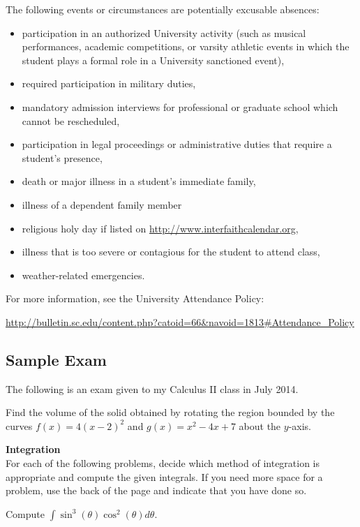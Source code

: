 \documentclass[teaching.portfolio.tex]{subfiles}
\begin{document}
\noindent
The following events or circumstances are potentially excusable absences:
\begin{itemize}
\item
  participation in an authorized University activity (such as musical performances, academic competitions, or varsity athletic events in which the student plays a formal role in a University sanctioned event),
\item
  required participation in military duties,
\item
  mandatory admission interviews for professional or graduate school which cannot be rescheduled,
\item
  participation in legal proceedings or administrative duties that require a student's presence,
\item
  death or major illness in a student’s immediate family,
\item
  illness of a dependent family member
\item
  religious holy day if listed on \url{http://www.interfaithcalendar.org},
\item
  illness that is too severe or contagious for the student to attend class,
\item
  weather-related emergencies.
\end{itemize}
For more information, see the University Attendance Policy:
\begin{center}
  \url{http://bulletin.sc.edu/content.php?catoid=66&navoid=1813#Attendance_Policy}
\end{center}
\subsection{Sample Exam}
The following is an exam given to my Calculus II class in July 2014.
\begin{thm}
  Find the volume of the solid obtained by rotating the region bounded by the curves $f(x) = 4(x - 2)^2$ and $g(x) = x^2 - 4x + 7$ about the $y$-axis.
\end{thm}

\textbf{Integration}\\

\noindent For each of the following problems, decide which method of integration is appropriate and compute the given integrals.
If you need more space for a problem, use the back of the page and indicate that you have done so.

\begin{thm}
  Compute $\displaystyle{\int\sin^3(\theta)\cos^2(\theta)d\theta}$.
\end{thm}
\end{document}
